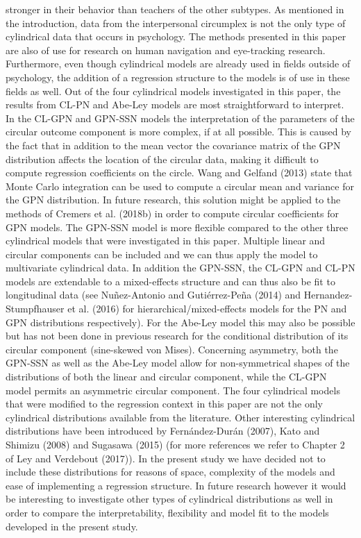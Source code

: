 \documentclass[man,mask]{apa6}
\begin{document}
stronger in their behavior than teachers of the other subtypes.\newline
\indent As mentioned in the introduction, data from the interpersonal circumplex
is not the only type of cylindrical data that occurs in psychology. The methods
presented in this paper are also of use for research on human navigation and
eye-tracking research. Furthermore, even though cylindrical models are already
used in fields outside of psychology, the addition of a regression structure to
the models is of use in these fields as well. \newline
\indent Out of the four cylindrical models investigated in this paper, the
results from CL-PN and Abe-Ley models are most straightforward to interpret. In
the CL-GPN and GPN-SSN models the interpretation of the parameters of the
circular outcome component is more complex, if at all possible. This is caused
by the fact that in addition to the mean vector the covariance matrix of the GPN
distribution affects the location of the circular data, making it difficult to
compute regression coefficients on the circle. Wang and Gelfand (2013) state that
Monte Carlo integration can be used to compute a circular mean and variance for
the GPN distribution. In future research, this solution might be applied to the
methods of Cremers et al. (2018b) in order to compute circular coefficients
for GPN models.\newline
\indent The GPN-SSN model is more flexible compared to the other three
cylindrical models that were investigated in this paper. Multiple linear and
circular components can be included and we can thus apply the model to
multivariate cylindrical data. In addition the GPN-SSN, the CL-GPN and CL-PN
models are extendable to a mixed-effects structure and can thus also be fit to
longitudinal data (see Nuñez-Antonio and Gutiérrez-Peña (2014) and Hernandez-Stumpfhauser et al. (2016) for
hierarchical/mixed-effects models for the PN and GPN distributions
respectively). For the Abe-Ley model this may also be possible but has not been
done in previous research for the conditional distribution of its circular
component (sine-skewed von Mises). Concerning asymmetry, both the GPN-SSN as
well as the Abe-Ley model allow for non-symmetrical shapes of the distributions
of both the linear and circular component, while the CL-GPN model permits an
asymmetric circular component.\newline
\indent The four cylindrical models that were modified to the regression
context in this paper are not the only cylindrical distributions
available from the literature. Other interesting cylindrical distributions have been introduced by
Fernández-Durán (2007), Kato and Shimizu (2008) and Sugasawa (2015) (for more references we
refer to Chapter 2 of Ley and Verdebout (2017)). In the present study we
have decided not to include these distributions for reasons of space,
complexity of the models and ease of implementing a regression
structure. In future research however it would be interesting to
investigate other types of cylindrical distributions as well in order to
compare the interpretability, flexibility and model fit to the models
developed in the present study.
\end{document}
